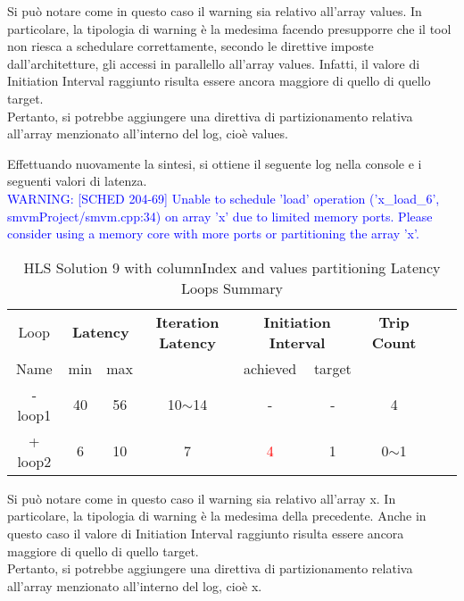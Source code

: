 Si può notare come in questo caso il warning sia relativo all'array values. In particolare, la tipologia di warning è la medesima facendo presupporre che il tool non riesca a schedulare correttamente, secondo le direttive imposte dall'architetture, gli accessi in parallello all'array values. Infatti, il valore di Initiation Interval raggiunto risulta essere ancora maggiore di quello di quello target. 
\\
Pertanto, si potrebbe aggiungere una direttiva di partizionamento relativa all'array menzionato all'interno del log, cioè values.



Effettuando nuovamente la sintesi, si ottiene il seguente log nella console e i seguenti valori di latenza.
\\
\textcolor{blue}{WARNING: [SCHED 204-69] Unable to schedule 'load' operation ('x\_load\_6', smvmProject/smvm.cpp:34) on array 'x' due to limited memory ports. Please consider using a memory core with more ports or partitioning the array 'x'.}

\begin{table}[H]
	\centering
	\begin{tabular}{|c|c|c|c|c|c|c|c|c|}
		\hline
		\multicolumn{1}{|c|}{Loop} & \multicolumn{2}{|c|}{\textbf{Latency}} & \multicolumn{1}{c|}{\textbf{Iteration Latency}} & \multicolumn{2}{c|}{\textbf{Initiation Interval}} & \multicolumn{1}{c|}{\textbf{Trip Count}}  \\
		Name & min & max &  & achieved & target &  \\
		\hline
		- loop1 & 40 & 56 & 10$\sim$14 & - & - & 4 \\
		+ loop2 & 6 & 10 & 7 & \textcolor{red}{4} & 1 & 0$\sim$1 \\
		\hline
	\end{tabular}
	\caption{HLS Solution 9 with columnIndex and values partitioning Latency Loops Summary}
	\label{tab:hls-solution-9-columnindex-values-partitioning-loop-summary}
\end{table}

Si può notare come in questo caso il warning sia relativo all'array x. In particolare, la tipologia di warning è la medesima della precedente. Anche in questo caso il valore di Initiation Interval raggiunto risulta essere ancora maggiore di quello di quello target. 
\\
Pertanto, si potrebbe aggiungere una direttiva di partizionamento relativa all'array menzionato all'interno del log, cioè x.

